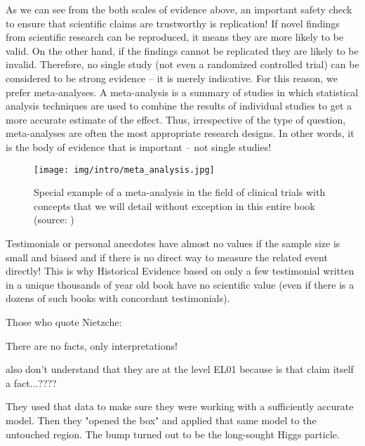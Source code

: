 	As we can see from the both scales of evidence above, an important safety check to ensure that scientific claims are trustworthy is replication! If novel findings from scientific research can be reproduced, it means they are more likely to be valid. On the other hand, if the findings cannot be replicated they are likely to be invalid. Therefore, no single study (not even a randomized controlled trial) can be considered to be strong evidence – it is merely indicative. For this reason, we prefer meta-analyses. A meta-analysis is a summary of studies in which statistical analysis techniques are used to combine the results of individual studies to get a more accurate estimate of the effect. Thus, irrespective of the type of question, meta-analyses are often the most appropriate research designs. In other words, it is the body of evidence that is important – not single studies!
	
	\begin{figure}[H]
		\centering
		\texttt{[image: img/intro/meta\_analysis.jpg]}
		\caption[Special example of a meta-analysis]{Special example of a meta-analysis in the field of clinical trials with concepts that we will detail without exception in this entire book (source: \cite{legg2007occupational})}
	\end{figure}
	
	\begin{tcolorbox}[title=Remark,arc=10pt,breakable,drop lifted shadow,
  skin=enhanced,
  skin first is subskin of={enhancedfirst}{arc=10pt,no shadow},
  skin middle is subskin of={enhancedmiddle}{arc=10pt,no shadow},
  skin last is subskin of={enhancedlast}{drop lifted shadow}]
	Testimonials or personal anecdotes have almost no values if the sample size is small and biased and if there is no direct way to measure the related event directly! This is why Historical Evidence based on only a few testimonial written in a unique thousands of year old book have no scientific value (even if there is a dozens of such books with concordant testimonials).
	\end{tcolorbox}	
	
	Those who quote Nietzche:
	\begin{fquote}There are no facts, only interpretations!
 	\end{fquote}
 	also don't understand that they are at the level EL01 because is that claim itself a fact...????
	
	They used that data to make sure they were working with a sufficiently accurate model. Then they "opened the box" and applied that same model to the untouched region. The bump turned out to be the long-sought Higgs particle.

